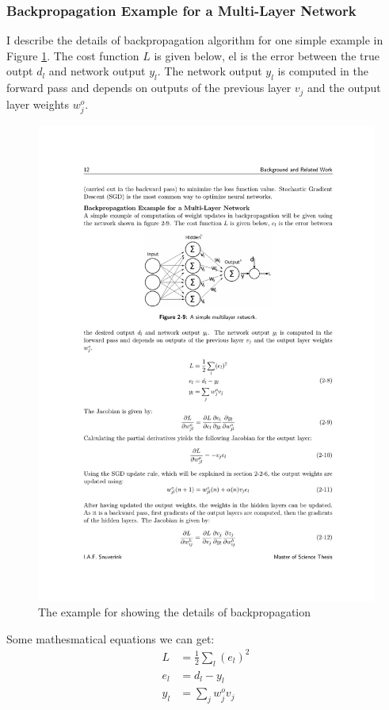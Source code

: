     \subsubsection{Backpropagation Example for a Multi-Layer Network}
    I describe the details of backpropagation algorithm for one simple example in Figure \ref{bp}. The cost function $L$ is given below, el is the error between the true outpt $d_l$ and network output $y_l$. The network output $y_l$ is computed in the forward pass and depends on outputs of the previous layer $v_j$ and the output layer weights $w^{o}_j$.
    \begin{figure}[!h]
        \centering
        \includegraphics{Figures/bp.pdf}
        \caption{The example for showing the details of backpropagation}
        \label{bp}
    \end{figure}
    Some mathesmatical equations we can get:
    \begin{equation}
        \begin{aligned}
            L &= \frac{1}{2} \sum_{l}(e_l)^2 \\
            e_l &= d_l -y_l \\
            y_l &= \sum_{j}w^{o}_j v_j 
        \end{aligned}
        \label{me}
    \end{equation}

